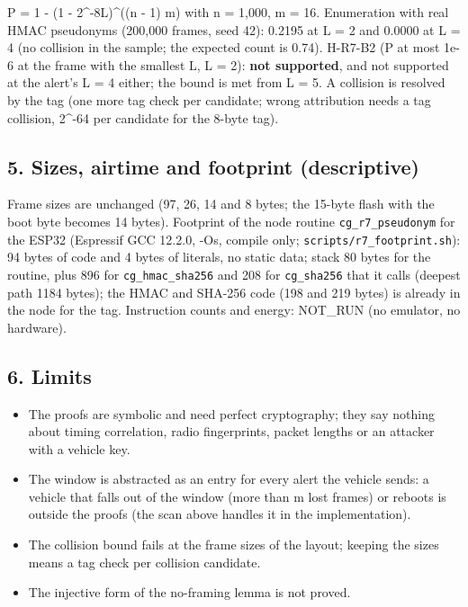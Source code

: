 P = 1 - (1 - 2\textasciicircum{}-8L)\textasciicircum{}((n - 1) m) with n = 1,000, m = 16. Enumeration with real HMAC pseudonyms (200,000 frames, seed 42): 0.2195 at L = 2 and 0.0000 at L = 4 (no collision in the sample; the expected count is 0.74). H-R7-B2 (P at most 1e-6 at the frame with the smallest L, L = 2): \textbf{not supported}, and not supported at the alert's L = 4 either; the bound is met from L = 5. A collision is resolved by the tag (one more tag check per candidate; wrong attribution needs a tag collision, 2\textasciicircum{}-64 per candidate for the 8-byte tag).

\subsection*{5. Sizes, airtime and footprint (descriptive)}

Frame sizes are unchanged (97, 26, 14 and 8 bytes; the 15-byte flash with the boot byte becomes 14 bytes). Footprint of the node routine \texttt{cg\_r7\_pseudonym} for the ESP32 (Espressif GCC 12.2.0, -Os, compile only; \texttt{scripts/r7\_footprint.sh}): 94 bytes of code and 4 bytes of literals, no static data; stack 80 bytes for the routine, plus 896 for \texttt{cg\_hmac\_sha256} and 208 for \texttt{cg\_sha256} that it calls (deepest path 1184 bytes); the HMAC and SHA-256 code (198 and 219 bytes) is already in the node for the tag. Instruction counts and energy: NOT\_RUN (no emulator, no hardware).

\subsection*{6. Limits}

\begin{itemize}
\item The proofs are symbolic and need perfect cryptography; they say nothing about timing correlation, radio fingerprints, packet lengths or an attacker with a vehicle key.
\item The window is abstracted as an entry for every alert the vehicle sends: a vehicle that falls out of the window (more than m lost frames) or reboots is outside the proofs (the scan above handles it in the implementation).
\item The collision bound fails at the frame sizes of the layout; keeping the sizes means a tag check per collision candidate.
\item The injective form of the no-framing lemma is not proved.
\end{itemize}


